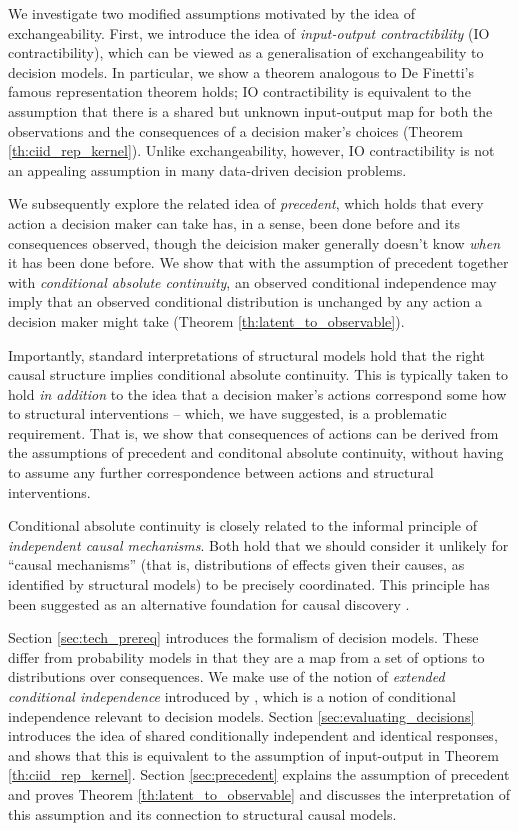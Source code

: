\documentclass{article}
\begin{document}
We investigate two modified assumptions motivated by the idea of exchangeability. First, we introduce the idea of \emph{input-output contractibility} (IO contractibility), which can be viewed as a generalisation of exchangeability to decision models. In particular, we show a theorem analogous to De Finetti's famous representation \citep{de_finetti_foresight_1992} theorem holds; IO contractibility is equivalent to the assumption that there is a shared but unknown input-output map for both the observations and the consequences of a decision maker's choices (Theorem \ref{th:ciid_rep_kernel}). Unlike exchangeability, however, IO contractibility is not an appealing assumption in many data-driven decision problems.

We subsequently explore the related idea of \emph{precedent}, which holds that every action a decision maker can take has, in a sense, been done before and its consequences observed, though the deicision maker generally doesn't know \emph{when} it has been done before.  We show that with the assumption of precedent together with \emph{conditional absolute continuity}, an observed conditional independence may imply that an observed conditional distribution is unchanged by any action a decision maker might take (Theorem \ref{th:latent_to_observable}).

Importantly, standard interpretations of structural models hold that the right causal structure implies conditional absolute continuity. This is typically taken to hold \emph{in addition} to the idea that a decision maker's actions correspond some how to structural interventions -- which, we have suggested, is a problematic requirement. That is, we show that consequences of actions can be derived from the assumptions of precedent and conditonal absolute continuity, without having to assume any further correspondence between actions and structural interventions.

Conditional absolute continuity is closely related to the informal principle of \emph{independent causal mechanisms}. Both hold that we should consider it unlikely for ``causal mechanisms'' (that is, distributions of effects given their causes, as identified by structural models) to be precisely coordinated. This principle has been suggested as an alternative foundation for causal discovery \citep{lemeire_replacing_2013}.

Section \ref{sec:tech_prereq} introduces the formalism of decision models. These differ from probability models in that they are a map from a set of options to distributions over consequences. We make use of the notion of \emph{extended conditional independence} introduced by \citet{constantinou_extended_2017}, which is a notion of conditional independence relevant to decision models. Section \ref{sec:evaluating_decisions} introduces the idea of shared conditionally independent and identical responses, and shows that this is equivalent to the assumption of input-output in Theorem \ref{th:ciid_rep_kernel}. Section \ref{sec:precedent} explains the assumption of precedent and proves Theorem \ref{th:latent_to_observable} and discusses the interpretation of this assumption and its connection to structural causal models.
\end{document}

